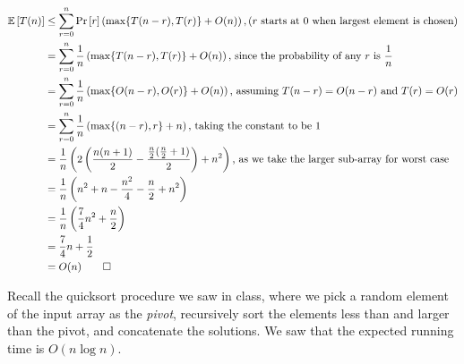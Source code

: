 \documentclass[addpoints]{exam}
\begin{document}
\begin{questions}
\begin{parts}
\begin{equation*}
\begin{aligned}
\mathbb{E} \left [ T(n) \right ] & \leq \sum_{r=0}^n \Pr \left [ r \right ] \left (\max\{ T(n-r), T(r) \} + O(n) \right ), \text{(} r \text{ starts at } 0 \text{ when largest element is chosen)}\\
&= \sum_{r=0}^n \frac{1}{n} \left (\max\{ T(n-r), T(r) \} + O(n) \right ) \text{, since the probability of any } r \text{ is } \frac{1}{n}\\
&= \sum_{r=0}^n \frac{1}{n} \left (\max\{ O(n-r), O(r) \} + O(n) \right ) \text{, assuming }T(n-r) = O(n-r) \text{ and } T(r)=O(r)\\
&= \sum_{r=0}^n \frac{1}{n} \left (\max\{(n-r), r \} + n \right )\text{, taking the constant to be } 1\\
&= \frac{1}{n} \left (2\left(\frac{n(n+1)}{2} - \frac{\frac{n}{2}(\frac{n}{2}+1)}{2} \right ) + n^2 \right ) \text{, as we take the larger sub-array for worst case}\\
&= \frac{1}{n} \left ( n^2 + n - \frac{n^2}{4} -\frac{n}{2} + n^2 \right )\\
&=\frac{1}{n} \left (\frac{7}{4} n^2  + \frac{n}{2} \right )\\
&= \frac{7}{4} n + \frac{1}{2} \\
&= O(n) \qed
\end{aligned}
\end{equation*}

\end{parts}

Recall the quicksort procedure we saw in class, where we pick a random element of the input array as the {\em pivot}, recursively sort the elements less than and larger than the pivot, and concatenate the solutions.  We saw that the expected running time is $O(n \log n)$.  

\end{questions}
\end{document}
